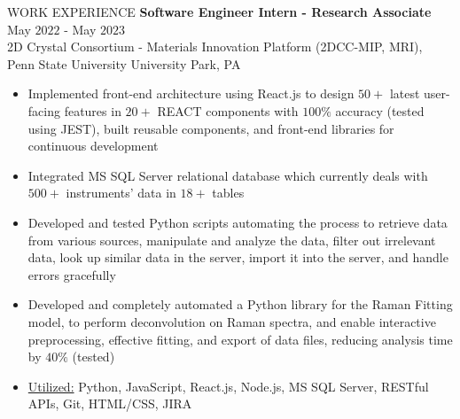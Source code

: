 \documentclass{resume} %
\begin{document}
\begin{rSection}{WORK EXPERIENCE}
{\bf Software Engineer Intern - Research Associate} \hfill May $2022$ - May $2023$\\
2D Crystal Consortium - Materials Innovation Platform (2DCC-MIP, MRI), Penn State University \hfill University Park, PA
\begin{itemize}[itemsep = -4pt]
    \item Implemented front-end architecture using React.js to design $50+$ latest user-facing features in $20+$ REACT components with $100\%$ accuracy (tested using JEST), built reusable components, and front-end libraries for continuous development
    \item Integrated MS SQL Server relational database which currently deals with $500+$ instruments' data in $18+$ tables
    \item Developed and tested Python scripts automating the process to retrieve data from various sources, manipulate and analyze the data, filter out irrelevant data, look up similar data in the server, import it into the server, and handle errors gracefully
    \item Developed and completely automated a Python library for the Raman Fitting model, to perform deconvolution on Raman spectra, and enable interactive preprocessing, effective fitting, and export of data files, reducing analysis time by $40\%$ (tested)
    \item \underline{Utilized:} Python, JavaScript, React.js, Node.js, MS SQL Server, RESTful APIs, Git, HTML/CSS, JIRA
\end{itemize}

\end{rSection} 


\end{document}
